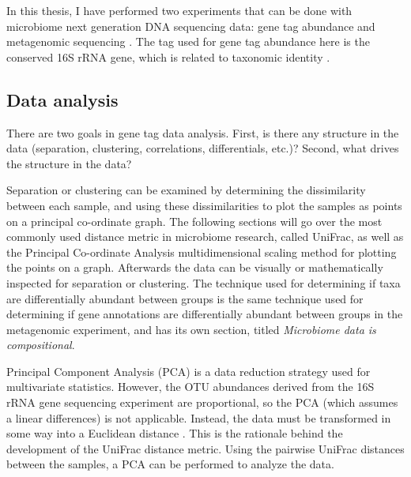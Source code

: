In this thesis, I have performed two experiments that can be done with microbiome next generation DNA sequencing data: gene tag abundance and metagenomic sequencing \cite{riesenfeld2004metagenomics}. The tag used for gene tag abundance here is the conserved 16S rRNA gene, which is related to taxonomic identity \cite{gloor2010microbiome}.

\FloatBarrier

\subsection{Data analysis}
There are two goals in gene tag data analysis. First, is there any structure in the data (separation, clustering, correlations, differentials, etc.)? Second, what drives the structure in the data?

Separation or clustering can be examined by determining the dissimilarity between each sample, and using these dissimilarities to plot the samples as points on a principal co-ordinate graph. The following sections will go over the most commonly used distance metric in microbiome research, called UniFrac, as well as the Principal Co-ordinate Analysis multidimensional scaling method for plotting the points on a graph. Afterwards the data can be visually or mathematically inspected for separation or clustering. The technique used for determining if taxa are differentially abundant between groups is the same technique used for determining if gene annotations are differentially abundant between groups in the metagenomic experiment, and has its own section, titled \textit{Microbiome data is compositional}.

Principal Component Analysis (PCA) is a data reduction strategy used for multivariate statistics. However, the OTU abundances derived from the 16S rRNA gene sequencing experiment are proportional, so the PCA (which assumes a linear differences) is not applicable. Instead, the data must be transformed in some way into a Euclidean distance \cite{anderson2003canonical}. This is the rationale behind the development of the UniFrac distance metric. Using the pairwise UniFrac distances between the samples, a PCA can be performed to analyze the data.

